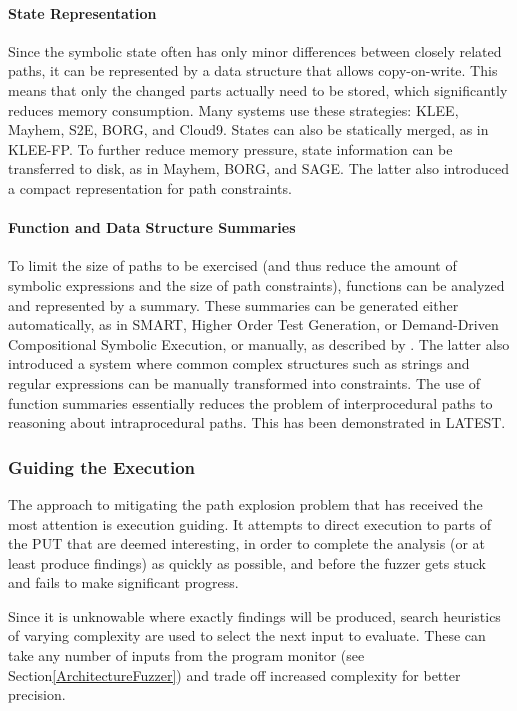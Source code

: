 \documentclass{article}
\begin{document}
\begin{multicols}{2}
    \paragraph{State Representation} Since the symbolic state often has only minor differences between closely related paths, it can be represented by a data structure that allows copy-on-write. This means that only the changed parts actually need to be stored, which significantly reduces memory consumption. Many systems use these strategies: KLEE\cite{KLEE}, Mayhem\cite{Mayhem}, S2E\cite{S2E}, BORG\cite{BORG}, and Cloud9\cite{Cloud9}. States can also be statically merged, as in KLEE-FP\cite{KLEEFP}. To further reduce memory pressure, state information can be transferred to disk, as in Mayhem\cite{Mayhem}, BORG\cite{BORG}, and SAGE\cite{SAGE}. The latter also introduced a compact representation for path constraints.\cite{SAGE}

    \paragraph{Function and Data Structure Summaries} To limit the size of paths to be exercised (and thus reduce the amount of symbolic expressions and the size of path constraints), functions can be analyzed and represented by a summary. These summaries can be generated either automatically, as in SMART\cite{SMART}, Higher Order Test Generation\cite{HigherOrderTestGeneration}, or Demand-Driven Compositional Symbolic Execution\cite{DDCSE}, or manually, as described by \citeauthor{PFA}\cite{PFA}. The latter also introduced a system where common complex structures such as strings and regular expressions can be manually transformed into constraints.\cite{PFA} The use of function summaries essentially reduces the problem of interprocedural paths to reasoning about intraprocedural paths. This has been demonstrated in LATEST\cite{LATEST}.

    \subsubsection{Guiding the Execution}
    The approach to mitigating the path explosion problem that has received the most attention is execution guiding. It attempts to direct execution to parts of the PUT that are deemed interesting, in order to complete the analysis (or at least produce findings) as quickly as possible, and before the fuzzer gets stuck and fails to make significant progress.

    Since it is unknowable where exactly findings will be produced, search heuristics of varying complexity are used to select the next input to evaluate. These can take any number of inputs from the program monitor (see Section\ref{ArchitectureFuzzer}) and trade off increased complexity for better precision.


\end{multicols}
\end{document}
